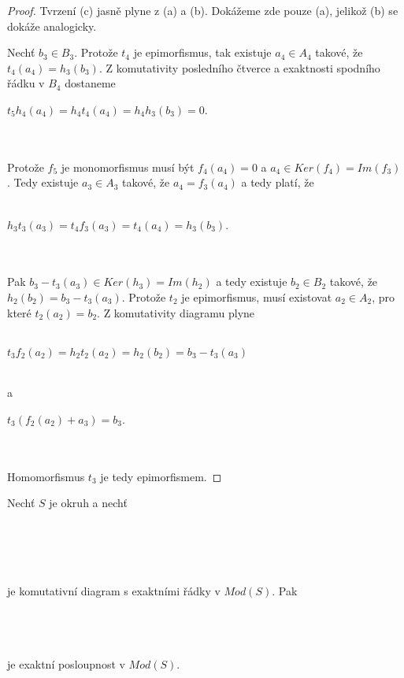      \begin{proof}
       Tvrzení (c) jasně plyne z (a) a (b). Dokážeme zde pouze (a), jelikož 
       (b) se dokáže analogicky.
       
       Nechť $b_3\in B_3$. Protože $t_4$ je epimorfismus, tak existuje $a_4\in A_4$ 
       takové, že $t_4(a_4)=h_3(b_3)$. Z komutativity posledního čtverce a 
       exaktnosti spodního řádku v $B_4$ dostaneme \\
       \centerline{$t_5h_4(a_4)=h_4t_4(a_4)=h_4h_3(b_3)=0$.} \\\\
       Protože $f_5$ je monomorfismus musí být $f_4(a_4)=0$ a $a_4\in 
       Ker(f_4)=Im(f_3)$. Tedy existuje $a_3\in A_3$ takové, že $a_4=f_3(a_4)$ a 
       tedy platí, že \\\\
       \centerline{$h_3t_3(a_3)=t_4f_3(a_3)=t_4(a_4)=h_3(b_3)$.} \\\\
       Pak $b_3-t_3(a_3)\in Ker(h_3)=Im(h_2)$ a tedy existuje $b_2\in B_2$ takové, že 
       $h_2(b_2)=b_3-t_3(a_3)$. Protože $t_2$ je epimorfismus, musí existovat $a_2\in A_2$, 
       pro které $t_2(a_2)=b_2$. Z komutativity diagramu plyne \\\\
       \centerline{$t_3f_2(a_2)=h_2t_2(a_2)=h_2(b_2)=b_3-t_3(a_3)$} \\
       a \\
       \centerline{$t_3(f_2(a_2)+a_3)=b_3$.} \\\\     
       Homomorfismus $t_3$ je tedy epimorfismem.  
     \end{proof}
     
     \begin{lem}\label{lem-komut-schod}
       Nechť $S$ je okruh a nechť \\\\
       \centerline{}\\\\\\
      je komutativní diagram s exaktními řádky v $Mod(S)$. Pak\\\\
       \centerline{}\\\\      
      je exaktní posloupnost v $Mod(S)$.
     \end{lem}
     
